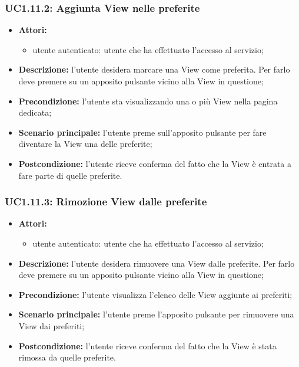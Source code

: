 \subsubsection{UC1.11.2: Aggiunta View nelle preferite}
\begin{itemize}
	\item \textbf{Attori:}
	\begin{itemize}
		\item utente autenticato: utente che ha effettuato l'accesso al servizio;
	\end{itemize}
	\item \textbf{Descrizione:} l'utente desidera marcare una View come preferita. Per farlo deve premere su un apposito pulsante vicino alla View in questione;
	\item \textbf{Precondizione:} l'utente sta visualizzando una o più View nella pagina dedicata;
	\item \textbf{Scenario principale:} l'utente preme sull'apposito pulsante per fare diventare la View una delle preferite;
	\item \textbf{Postcondizione:} l'utente riceve conferma del fatto che la View è entrata a fare parte di quelle preferite.
\end{itemize}


\subsubsection{UC1.11.3: Rimozione View dalle preferite}
\begin{itemize}
	\item \textbf{Attori:}
	\begin{itemize}
		\item utente autenticato: utente che ha effettuato l'accesso al servizio;
	\end{itemize}
	\item \textbf{Descrizione:} l'utente desidera rimuovere una View dalle preferite. Per farlo deve premere su un apposito pulsante vicino alla View in questione;
	\item \textbf{Precondizione:} l'utente visualizza l'elenco delle View aggiunte ai preferiti;
	\item \textbf{Scenario principale:} l'utente preme l'apposito pulsante per rimuovere una View dai preferiti;
	\item \textbf{Postcondizione:} l'utente riceve conferma del fatto che la View è stata rimossa da quelle preferite.
\end{itemize}

